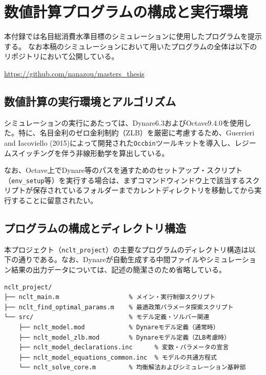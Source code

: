 
\chapter{数値計算プログラムの構成と実行環境}
\label{chap:appendix_programs_overview}

本付録では名目総消費水準目標のシミュレーションに使用したプログラムを提示する。
なお本稿のシミュレーションにおいて用いたプログラムの全体は以下のリポジトリにおいて公開している。

\url{https://github.com/nanazou/masters_thesis}

\section*{数値計算の実行環境とアルゴリズム}

シミュレーションの実行にあたっては、Dynare6.3およびOctave9.4.0を使用した。特に、名目金利のゼロ金利制約（ZLB）を厳密に考慮するため、Guerrieri and Iacoviello (2015)によって開発された\texttt{Occbin}ツールキットを導入し、レジームスイッチングを伴う非線形動学を算出している。

なお、Octave上でDynare等のパスを通すためのセットアップ・スクリプト（\texttt{env\_setup}等）を実行する場合は、まずコマンドウィンドウ上で該当するスクリプトが保存されているフォルダーまでカレントディレクトリを移動してから実行することに留意されたい。

\section*{プログラムの構成とディレクトリ構造}

本プロジェクト（\texttt{nclt\_project}）の主要なプログラムのディレクトリ構造は以下の通りである。なお、Dynareが自動生成する中間ファイルやシミュレーション結果の出力データについては、記述の簡潔さのため省略している。

\begin{verbatim}
nclt_project/
├── nclt_main.m                   % メイン・実行制御スクリプト
├── nclt_find_optimal_params.m    % 最適政策パラメータ探索スクリプト
└── src/                          % モデル定義・ソルバー関連
    ├── nclt_model.mod            % Dynareモデル定義（通常時）
    ├── nclt_model_zlb.mod        % Dynareモデル定義（ZLB考慮時）
    ├── nclt_model_declarations.inc      % 変数・パラメータの宣言
    ├── nclt_model_equations_common.inc  % モデルの共通方程式
    └── nclt_solve_core.m         % 均衡解法およびシミュレーション基幹部
\end{verbatim}

